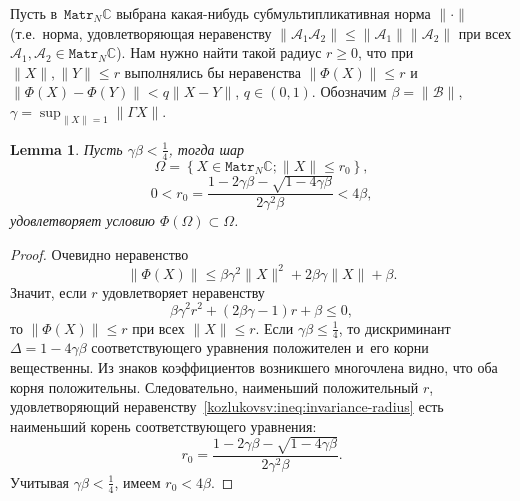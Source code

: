 \documentclass[a4paper]{article}
\newtheorem{lem}{Lemma}
\theoremstyle{definition}
\begin{document}
Пусть в~\( \mathtt{Matr}_N\mathbb{C} \)
выбрана какая-нибудь субмультипликативная норма \( \|\cdot\| \)
(т.е.~норма, удовлетворяющая неравенству
 \( \| \mathcal{A}_1\mathcal{A}_2 \| \leq \|\mathcal{A}_1\|\|\mathcal{A}_2\| \)
 при всех \( \mathcal{A}_1, \mathcal{A}_2 \in \mathtt{Matr}_N\mathbb{C} \)).
Нам нужно найти такой радиус \( r \geq 0 \),
что при \( \|X\|,\|Y\| \leq r \) выполнялись бы неравенства \( \|\Phi(X)\| \leq r \)
и~\( \|\Phi(X) - \Phi(Y)\| < q\|X-Y\| \), \( q\in(0,1) \).
Обозначим
\( \beta = \|\mathcal{B}\| \), \( \gamma = \sup_{\|X\|=1} \|\Gamma X\| \).

\begin{lem}
    Пусть \( \gamma\beta < \frac14\),
    тогда шар
    \[
        \Omega = \left\{ X\in \mathtt{Matr}_N\mathbb{C}; \|X\| \leq r_0 \right\}, \]
    \[  0 < r_0 = \frac{1 - 2\gamma\beta - \sqrt{1-4\gamma\beta}}{2\gamma^2\beta} < 4\beta, \]
    удовлетворяет условию \( \Phi(\Omega)\subset\Omega \).
\end{lem}
\begin{proof}
Очевидно неравенство
    \[ \| \Phi(X) \| \leq
     \beta \gamma^2 \|X\|^2 + 2\beta\gamma\|X\| + \beta. \]
Значит, если \( r \) удовлетворяет неравенству
    \begin{equation}\label{kozlukovsv:ineq:invariance-radius}
        \beta \gamma^2 r^2 + (2\beta\gamma - 1)r + \beta \leq 0,
    \end{equation}
    то \( \|\Phi(X)\| \leq r \) при всех \( \|X\| \leq r \).
Если \( \gamma\beta \leq \frac14 \),
    то дискриминант \( \Delta = 1-4\gamma\beta \)
    соответствующего уравнения положителен и~его корни вещественны.
Из знаков коэффициентов возникшего многочлена видно, что оба корня положительны.
Следовательно, наименьший положительный \( r \),
    удовлетворяющий неравенству~\eqref{kozlukovsv:ineq:invariance-radius}
    есть наименьший корень
    соответствующего уравнения:
    \[ r_0 = \frac{1 - 2\gamma\beta - \sqrt{1-4\gamma\beta}}{2\gamma^2\beta}. \]
Учитывая \( \gamma\beta<\frac14 \), имеем \( r_0 < 4\beta \).
\end{proof}
\end{document}
